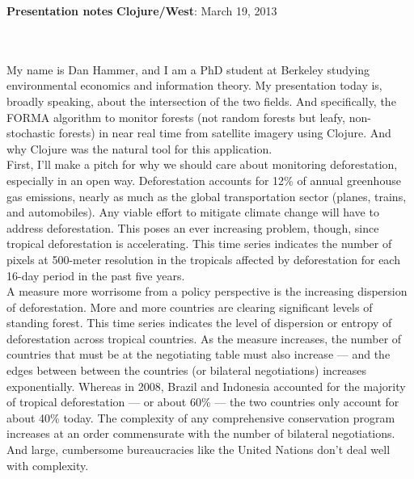\documentclass{article}
\title{}
\author{}
\date{\today}
\begin{document}
\renewcommand{\name}[1]{\textcolor{blue}{{\bf #1}}}
\renewcommand{\team}[1]{\textcolor{red}{{\bf #1}}}
\setlength{\parindent}{0in}

\textbf{Presentation notes}  \hfill
\textbf{Clojure/West}: March 19, 2013 \\ \hline \\ \\ \vspace{15pt}

\doublespacing

My name is Dan Hammer, and I am a PhD student at Berkeley studying
environmental economics and information theory. My presentation today
is, broadly speaking, about the intersection of the two fields.  And
specifically, the FORMA algorithm to monitor forests (not random
forests but leafy, non-stochastic forests) in near real time from
satellite imagery using Clojure. And why Clojure was the natural tool
for this application.\\

First, I'll make a pitch for why we should care about monitoring
deforestation, especially in an open way.  Deforestation accounts for
12\% of annual greenhouse gas emissions, nearly as much as the global
transportation sector (planes, trains, and automobiles).  Any viable
effort to mitigate climate change will have to address deforestation.
This poses an ever increasing problem, though, since tropical
deforestation is accelerating.  This time series indicates the number
of pixels at 500-meter resolution in the tropicals affected by
deforestation for each 16-day period in the past five years.  \\

A measure more worrisome from a policy perspective is the increasing
dispersion of deforestation.  More and more countries are clearing
significant levels of standing forest.  This time series indicates the
level of dispersion or entropy of deforestation across tropical
countries.  As the measure increases, the number of countries that
must be at the negotiating table must also increase --- and the edges
between between the countries (or bilateral negotiations) increases
exponentially.  Whereas in 2008, Brazil and Indonesia accounted for
the majority of tropical deforestation --- or about 60\% --- the two
countries only account for about 40\% today.  The complexity of any
comprehensive conservation program increases at an order commensurate
with the number of bilateral negotiations.  And large, cumbersome
bureaucracies like the United Nations don't deal well with complexity.  \\
\end{document}
